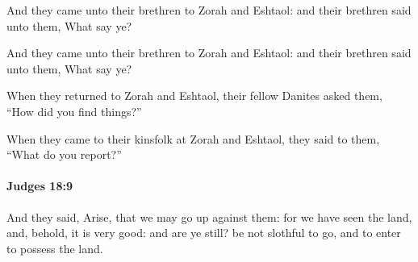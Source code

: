 			And they came unto their brethren to Zorah and Eshtaol: and their brethren said unto them, What say ye?

			\begin{versebox}
					\item[BHS] 
					\item[ASV] And they came unto their brethren to Zorah and Eshtaol: and their brethren said unto them, What say ye?
					\item[NIV] When they returned to Zorah and Eshtaol, their fellow Danites asked them, “How did you find things?”
					\item[NRSV] When they came to their kinsfolk at Zorah and Eshtaol, they said to them, “What do you report?”
			\end{versebox}

		\paragraph{Judges 18:9} %
			\label{JUDGES-18-9}

			And they said, Arise, that we may go up against them: for we have seen the land, and, behold, it is very good: and are ye still? be not slothful to go, and to enter to possess the land.

